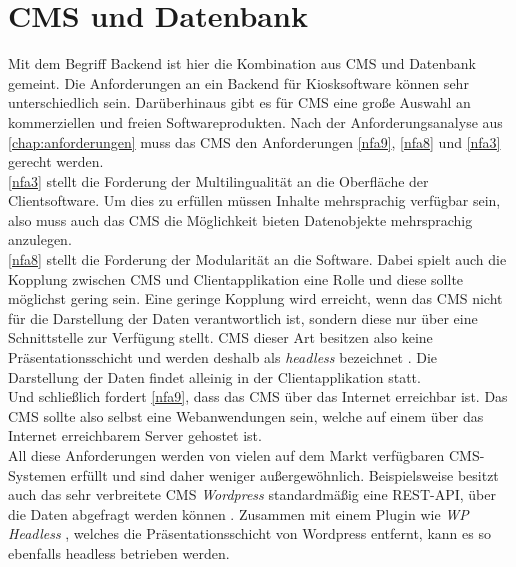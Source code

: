 \section{CMS und Datenbank}
\label{sec:backend}

Mit dem Begriff Backend ist hier die Kombination aus CMS und Datenbank gemeint. Die 
Anforderungen an ein Backend für Kiosksoftware können sehr unterschiedlich sein. Darüberhinaus
gibt es für CMS eine große Auswahl an kommerziellen und freien Softwareprodukten.
Nach der Anforderungsanalyse aus \autoref{chap:anforderungen} muss das CMS den Anforderungen
\ref{nfa9}, \ref{nfa8} und \ref{nfa3} gerecht werden.\\

\ref{nfa3} stellt die Forderung der Multilingualität an die Oberfläche der Clientsoftware. 
Um dies zu erfüllen müssen Inhalte mehrsprachig verfügbar sein, also muss auch 
das CMS die Möglichkeit bieten Datenobjekte mehrsprachig anzulegen.\\

\ref{nfa8} stellt die Forderung der Modularität an die Software. 
Dabei spielt auch die Kopplung zwischen CMS und 
Clientapplikation eine Rolle und diese sollte möglichst gering sein. Eine geringe Kopplung
wird erreicht, wenn das CMS nicht für die Darstellung der Daten verantwortlich ist, sondern 
diese nur über eine Schnittstelle zur Verfügung stellt. CMS dieser Art besitzen also 
keine Präsentationsschicht und werden deshalb als \emph{headless} bezeichnet \cite{headless-market}.
Die Darstellung der Daten findet alleinig in der Clientapplikation statt.\\

Und schließlich fordert \ref{nfa9}, dass das CMS über das Internet erreichbar ist. 
Das CMS sollte also selbst eine Webanwendungen sein, welche auf einem über das Internet erreichbarem Server
gehostet ist.\\

All diese Anforderungen werden von vielen auf dem Markt verfügbaren CMS-Systemen erfüllt
und sind daher weniger außergewöhnlich. Beispielsweise besitzt auch das sehr verbreitete CMS \emph{Wordpress} 
standardmäßig eine REST-API, über die Daten abgefragt werden können \cite{wordpress}. Zusammen mit einem 
Plugin wie \emph{WP Headless} \cite{wordpress-headless}, welches die Präsentationsschicht von Wordpress
entfernt, kann es so ebenfalls headless betrieben werden. \\

